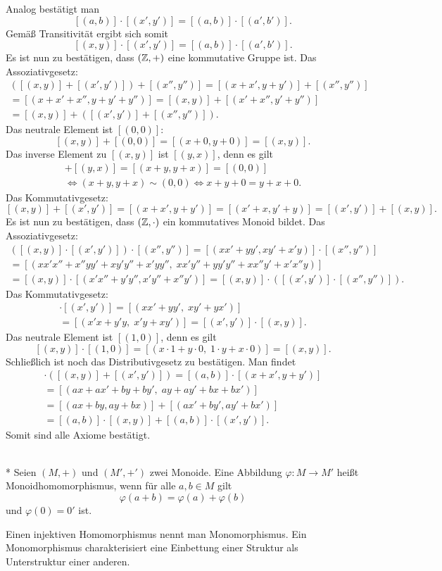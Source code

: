 Analog bestätigt man
\[[(a,b)]\cdot [(x',y')] = [(a,b)]\cdot [(a',b')].\]
Gemäß Transitivität ergibt sich somit
\[[(x,y)]\cdot [(x',y')] = [(a,b)]\cdot [(a',b')].\]
Es ist nun zu bestätigen, dass $(\mathbb Z,+)$ eine kommutative Gruppe ist.
Das Assoziativgesetz:
\begin{gather*}
([(x,y)]+[(x',y')])+[(x'',y'')]
= [(x+x',y+y')] + [(x'',y'')]\\
= [(x+x'+x'',y+y'+y'')]
= [(x,y)]+[(x'+x'',y'+y'')]\\
= [(x,y)]+([(x',y')]+[(x'',y'')]).
\end{gather*}
Das neutrale Element ist $[(0,0)]$:
\[[(x,y)]+[(0,0)] = [(x+0,y+0)] = [(x,y)].\]
Das inverse Element zu $[(x,y)]$ ist $[(y,x)]$, denn es gilt
\begin{gather*}
[(x,y)]+[(y,x)] = [(x+y,y+x)] = [(0,0)]\\
\iff (x+y,y+x)\sim (0,0)\iff x+y+0 = y+x+0.
\end{gather*}
Das Kommutativgesetz:
\[[(x,y)]+[(x',y')] = [(x+x',y+y')] = [(x'+x,y'+y)]
= [(x',y')]+[(x,y)].\]
Es ist nun zu bestätigen, dass $(\mathbb Z,\cdot)$ ein kommutatives
Monoid bildet. Das Assoziativgesetz:
\begin{gather*}
([(x,y)]\cdot [(x',y')])\cdot [(x'',y'')]
= [(xx'+yy',xy'+x'y)]\cdot [(x'',y'')]\\
= [(xx'x''+x''yy'+xy'y''+x'yy'',\;
xx'y''+yy'y''+xx''y'+x'x''y)]\\
= [(x,y)]\cdot [(x'x''+y'y'',x'y''+x''y')]
= [(x,y)]\cdot ([(x',y')]\cdot [(x'',y'')]).
\end{gather*}
Das Kommutativgesetz:
\begin{gather*}
[(x,y)]\cdot [(x',y')] = [(xx'+yy',\;xy'+yx')]\\
= [(x'x+y'y,\;x'y+xy')] = [(x',y')]\cdot [(x,y)].
\end{gather*}
Das neutrale Element ist $[(1,0)]$, denn es gilt
\[[(x,y)]\cdot [(1,0)] = [(x\cdot 1+y\cdot 0,\;1\cdot y+x\cdot 0)]
= [(x,y)].\]
Schließlich ist noch das Distributivgesetz zu bestätigen.
Man findet
\begin{gather*}
[(a,b)]\cdot ([(x,y)]+[(x',y')])
= [(a,b)]\cdot [(x+x',y+y')]\\
= [(ax+ax'+by+by',\;ay+ay'+bx+bx')]\\
= [(ax+by,ay+bx)]+[(ax'+by',ay'+bx')]\\
= [(a,b)]\cdot [(x,y)] + [(a,b)]\cdot [(x',y')].
\end{gather*}
Somit sind alle Axiome bestätigt.\;\qedsymbol

\begin{Definition}[Monoidhomomorphismus]\mbox{}\\*
Seien $(M,+)$ und $(M',+')$ zwei Monoide. Eine Abbildung
$\varphi\colon M\to M'$ heißt Monoidhomomorphismus, wenn
für alle $a,b\in M$ gilt
\[\varphi(a+b) = \varphi(a)+\varphi(b)\]
und $\varphi(0)=0'$ ist.
\end{Definition}
Einen injektiven Homomorphismus nennt man Monomorphismus. Ein
Monomorphismus charakterisiert eine Einbettung einer Struktur als
Unterstruktur einer anderen.

